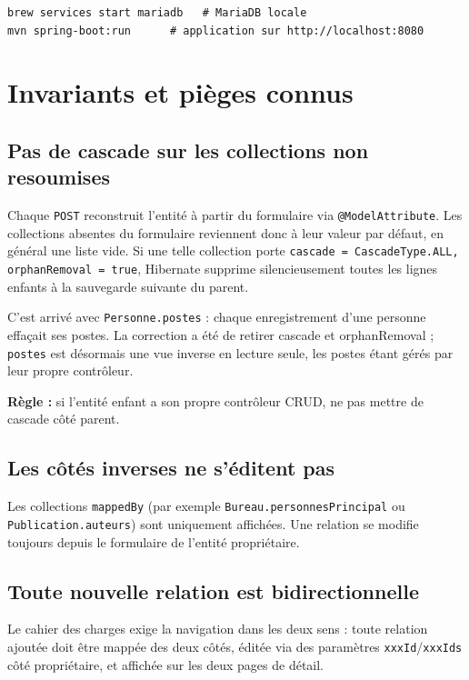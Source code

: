 \documentclass[a4paper,11pt]{article}
\newcommand{\code}[1]{\texttt{#1}}
\begin{document}
\begin{lstlisting}
brew services start mariadb   # MariaDB locale
mvn spring-boot:run      # application sur http://localhost:8080
\end{lstlisting}

\section{Invariants et pièges connus}

\subsection{Pas de cascade sur les collections non resoumises}

Chaque \code{POST} reconstruit l'entité à partir du formulaire via
\code{@ModelAttribute}. Les collections absentes du formulaire reviennent donc
à leur valeur par défaut, en général une liste vide. Si une telle collection
porte \code{cascade = CascadeType.ALL, orphanRemoval = true}, Hibernate
supprime silencieusement toutes les lignes enfants à la sauvegarde suivante du
parent.

C'est arrivé avec \code{Personne.postes} : chaque enregistrement d'une
personne effaçait ses postes. La correction a été de retirer cascade et
orphanRemoval ; \code{postes} est désormais une vue inverse en lecture seule,
les postes étant gérés par leur propre contrôleur.

\textbf{Règle :} si l'entité enfant a son propre contrôleur CRUD, ne pas
mettre de cascade côté parent.

\subsection{Les côtés inverses ne s'éditent pas}

Les collections \code{mappedBy} (par exemple \code{Bureau.personnesPrincipal}
ou \code{Publication.auteurs}) sont uniquement affichées. Une relation se
modifie toujours depuis le formulaire de l'entité propriétaire.

\subsection{Toute nouvelle relation est bidirectionnelle}

Le cahier des charges exige la navigation dans les deux sens : toute relation
ajoutée doit être mappée des deux côtés, éditée via des paramètres
\code{xxxId}/\code{xxxIds} côté propriétaire, et affichée sur les deux pages de
détail.
\end{document}
